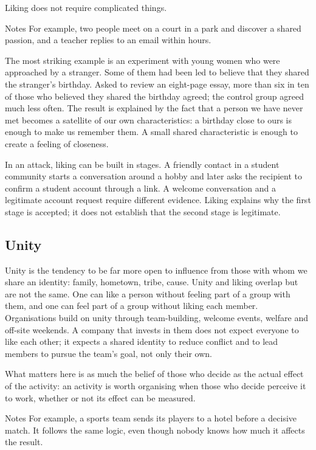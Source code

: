 Liking does not require complicated things.

\begin{nota}{Notes}
	For example, two people meet on a court in a park and discover a shared passion, and a teacher replies to an email within hours.
\end{nota}

The most striking example is an experiment with young women who were approached by a stranger. Some of them had been led to believe that they shared the stranger's birthday. Asked to review an eight-page essay, more than six in ten of those who believed they shared the birthday agreed; the control group agreed much less often. The result is explained by the fact that a person we have never met becomes a satellite of our own characteristics: a birthday close to ours is enough to make us remember them. A small shared characteristic is enough to create a feeling of closeness.

In an attack, liking can be built in stages. A friendly contact in a student community starts a conversation around a hobby and later asks the recipient to confirm a student account through a link. A welcome conversation and a legitimate account request require different evidence. Liking explains why the first stage is accepted; it does not establish that the second stage is legitimate.

\subsection{Unity}
Unity is the tendency to be far more open to influence from those with whom we share an identity: family, hometown, tribe, cause. Unity and liking overlap but are not the same. One can like a person without feeling part of a group with them, and one can feel part of a group without liking each member. Organisations build on unity through team-building, welcome events, welfare and off-site weekends. A company that invests in them does not expect everyone to like each other; it expects a shared identity to reduce conflict and to lead members to pursue the team's goal, not only their own.

What matters here is as much the belief of those who decide as the actual effect of the activity: an activity is worth organising when those who decide perceive it to work, whether or not its effect can be measured.

\begin{nota}{Notes}
	For example, a sports team sends its players to a hotel before a decisive match. It follows the same logic, even though nobody knows how much it affects the result.
\end{nota}

